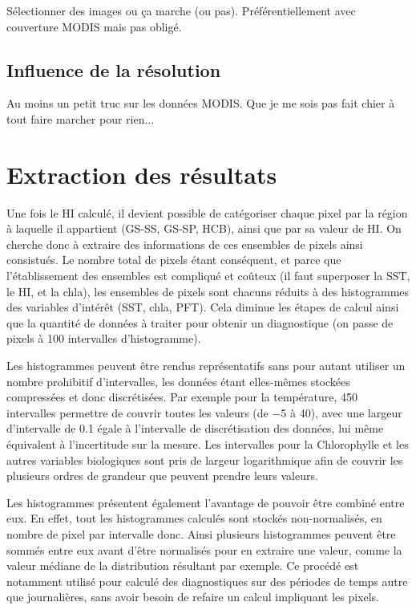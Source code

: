 \documentclass[index]{subfiles}
\begin{document}
Sélectionner des images ou ça marche (ou pas).
Préférentiellement avec couverture MODIS mais pas obligé.

\subsection{Influence de la résolution}

Au moins un petit truc sur les données MODIS.
Que je me sois pas fait chier à tout faire marcher pour rien...

\section{Extraction des résultats}

Une fois le HI calculé, il devient possible de catégoriser chaque pixel par la région à laquelle il appartient (GS-SS, GS-SP, HCB), ainsi que par sa valeur de HI.
On cherche donc à extraire des informations de ces ensembles de pixels ainsi consistués.
Le nombre total de pixels étant conséquent, et parce que l'établissement des ensembles est compliqué et coûteux (il faut superposer la SST, le HI, et la \gls{chla}), les ensembles de pixels sont chacuns réduits à des histogrammes des variables d'intérêt (SST, \gls{chla}, PFT).
Cela diminue les étapes de calcul ainsi que la quantité de données à traiter pour obtenir un diagnostique (on passe de  pixels à \num{100} intervalles d'histogramme).

Les histogrammes peuvent être rendus représentatifs sans pour autant utiliser un nombre prohibitif d'intervalles, les données étant elles-mêmes stockées compressées et donc discrétisées. Par exemple pour la température, 450 intervalles permettre de couvrir toutes les valeurs (de \qty{-5}{\dC} à \qty{40}{\dC}), avec une largeur d'intervalle de \qty{0.1}{\dC} égale à l'intervalle de discrétisation des données, lui même équivalent à l'incertitude sur la mesure.
Les intervalles pour la Chlorophylle et les autres variables biologiques sont pris de largeur logarithmique afin de couvrir les plusieurs ordres de grandeur que peuvent prendre leurs valeurs.

Les histogrammes présentent également l'avantage de pouvoir être combiné entre eux.
En effet, tout les histogrammes calculés sont stockés non-normalisés, en nombre de pixel par intervalle donc. Ainsi plusieurs histogrammes peuvent être sommés entre eux avant d'être normalisés pour en extraire une valeur, comme la valeur médiane de la distribution résultant par exemple.
Ce procédé est notamment utilisé pour calculé des diagnostiques sur des périodes de temps autre que journalières, sans avoir besoin de refaire un calcul impliquant les pixels.
\end{document}
